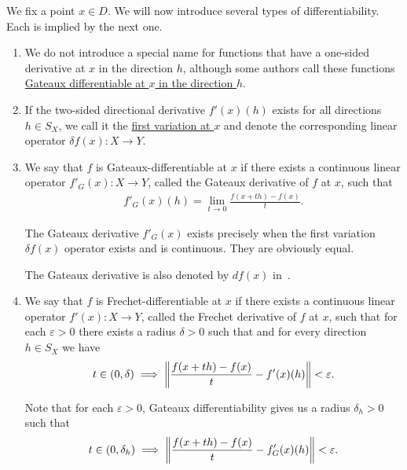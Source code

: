 \begin{definition}\label{def:analysis:banach:differentiability}
  We fix a point $x \in D$. We will now introduce several types of differentiability. Each is implied by the next one.

  \begin{enumerate}
    \item We do not introduce a special name for functions that have a one-sided derivative at $x$ in the direction $h$, although some authors call these functions \uline{Gateaux differentiable at $x$ in the direction $h$}. %

    \item\cite[0.2.1]{Ioffe1974} If the two-sided directional derivative $f'(x)(h)$ exists for all directions $h \in S_X$, we call it the \uline{first variation at $x$} and denote the corresponding linear operator $\delta f(x): X \to Y$.

    \item\cite[definition 1.12]{Phelps1993} We say that $f$ is Gateaux-differentiable at $x$ if there exists a continuous linear operator $f'_G(x): X \to Y$, called the Gateaux derivative of $f$ at $x$, such that
    \begin{align*}
      f'_G(x)(h) = \lim_{t \to 0} \frac {f(x + th) - f(x)} t.
    \end{align*}

    The Gateaux derivative $f'_G(x)$ exists precisely when the first variation $\delta f(x)$ operator exists and is continuous. They are obviously equal.

    The Gateaux derivative is also denoted by $df(x)$ in~\cite[definition 1.12]{Phelps1993}.

    \item\cite[definition 1.12]{Phelps1993} We say that $f$ is Frechet-differentiable at $x$ if there exists a continuous linear operator $f'(x): X \to Y$, called the Frechet derivative of $f$ at $x$, such that for each $\varepsilon > 0$ there exists a radius $\delta > 0$ such that and for every direction $h \in S_X$ we have
    \begin{align*}
      t \in (0, \delta) \implies \left\Vert  \frac {f(x + th) - f(x)} t - f'(x)(h) \right\Vert < \varepsilon.
    \end{align*}

    Note that for each $\varepsilon > 0$, Gateaux differentiability gives us a radius $\delta_h > 0$ such that
    \begin{align*}
      t \in (0, \delta_h) \implies \left\Vert  \frac {f(x + th) - f(x)} t - f_G'(x)(h) \right\Vert < \varepsilon.
    \end{align*}


\end{enumerate}
\end{definition}

